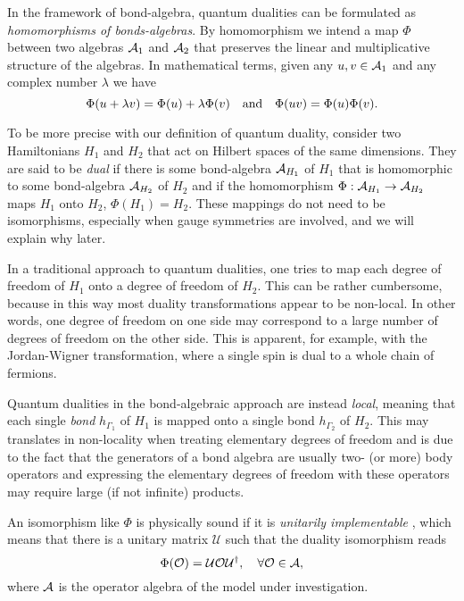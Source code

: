 In the framework of bond-algebra, quantum dualities can be formulated as \emph{homomorphisms of bonds-algebras}.
By homomorphism we intend a map $\Phi$ between two algebras $\mathcal{A}_1$ and $\mathcal{A}_2$ that preserves the linear and multiplicative structure of the algebras.
In mathematical terms, given any $u,v \in \mathcal{A}_1$ and any complex number $\lambda$ we have
\begin{equation*}
    \Phi(u + \lambda v) = \Phi(u) + \lambda \Phi(v)
    \qand
    \Phi(u v) = \Phi(u) \Phi(v).
\end{equation*}

To be more precise with our definition of quantum duality,
consider two Hamiltonians $H_1$ and $H_2$ that act on Hilbert spaces of the same dimensions.
They are said to be \emph{dual} if there is some bond-algebra $\mathcal{A}_{H_1}$ of $H_1$ that is homomorphic to some bond-algebra $\mathcal{A}_{H_2}$ of $H_2$ and if the homomorphism $\Phi : \mathcal{A}_{H_1} \to \mathcal{A}_{H_2}$ maps $H_1$ onto $H_2$, $\Phi(H_1) = H_2$.
These mappings do not need to be isomorphisms, especially when gauge symmetries are involved, and we will explain why later.

In a traditional approach to quantum dualities, one tries to map each degree of freedom of $H_1$ onto a degree of freedom of $H_2$.
This can be rather cumbersome, because in this way most duality transformations appear to be non-local.
In other words, one degree of freedom on one side may correspond to a large number of degrees of freedom on the other side.
This is apparent, for example, with the Jordan-Wigner transformation, where a single spin is dual to a whole chain of fermions.

Quantum dualities in the bond-algebraic approach are instead \emph{local}, meaning that each single \emph{bond} $h_{\Gamma_1}$ of $H_1$ is mapped onto a single bond $h_{\Gamma_2}$ of $H_2$.
This may translates in non-locality when treating elementary degrees of freedom and is due to the fact that the generators of a bond algebra are usually two- (or more) body operators and expressing the elementary degrees of freedom with these operators may require large (if not infinite) products.

An isomorphism like $\Phi$ is physically sound if it is \emph{unitarily implementable} \cite{cobanera2011bond}, which means that there is a unitary matrix $\mathcal{U}$ such that the duality isomorphism reads
\begin{equation}
    \Phi(\mathcal{O}) =
    \mathcal{U} \mathcal{O} \mathcal{U}^{\dagger}, \quad
    \forall \mathcal{O} \in \mathcal{A},
\end{equation}
where $\mathcal{A}$ is the operator algebra of the model under investigation.


